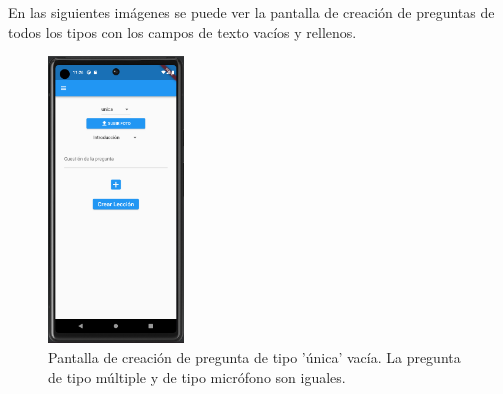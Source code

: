 En las siguientes imágenes se puede ver la pantalla de creación de preguntas de todos los tipos con los campos de texto vacíos y rellenos.
\begin{figure}[H]
  \centering
  \includegraphics[width=0.32\textwidth]{imagenes/c7/crearpreguntaunica1.png}
  \caption{Pantalla de creación de pregunta de tipo 'única' vacía. La pregunta de tipo múltiple y de tipo micrófono son iguales.} 
  \label{fig:crearpreguntaunica}
\end{figure}


